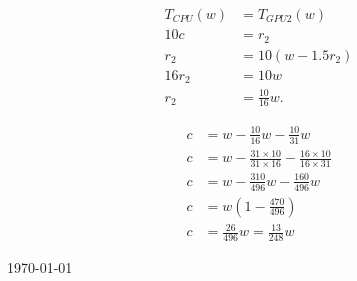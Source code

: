 \documentclass[fontsize=11pt, paper=a4, titlepage]{article}
\begin{document}
\begin{enumerate}[a)]
        \begin{align*}
            T_{CPU}(w) &= T_{GPU2}(w) \\
            10c &= r_2 \\
            r_2 &= 10(w - 1.5r_2) \\
            16r_2 &= 10w \\
            r_2 &= \frac{10}{16}w.
        \end{align*}

        \begin{align*}
            c &= w - \frac{10}{16}w - \frac{10}{31}w \\
            c &= w - \frac{31\times 10}{31\times 16} - \frac{16\times 10}{16\times 31} \\
            c &= w - \frac{310}{496}w - \frac{160}{496}w \\
            c &= w(1-\frac{470}{496}) \\
            c &= \frac{26}{496}w = \frac{13}{248}w
        \end{align*}

    \end{enumerate}

\vfill
\hfill \large{\today}
\end{document}
